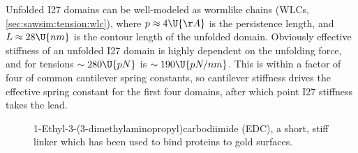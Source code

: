 Unfolded I27 domains can be well-modeled as wormlike chains (WLCs,
\cref{sec:sawsim:tension:wlc})\citep{carrion-vazquez99b}, where $p
\approx 4\U{\AA}$ is the persistence length, and $L \approx 28\U{nm}$
is the contour length of the unfolded domain.  Obviously effective
stiffness of an unfolded I27 domain is highly dependent on the
unfolding force, and for tensions $\sim 280\U{pN}$ is $\sim
190\U{pN/nm}$.  This is within a factor of four of common cantilever
spring constants, so cantilever stiffness drives the effective spring
constant for the first four domains, after which point I27 stiffness
takes the lead.

\begin{figure}
  \caption{1-Ethyl-3-(3-dimethylaminopropyl)carbodiimide (EDC), a
    short, stiff linker which has been used to bind proteins to gold
    surfaces\cite{lee05}.\label{fig:EDC}}
\end{figure}
